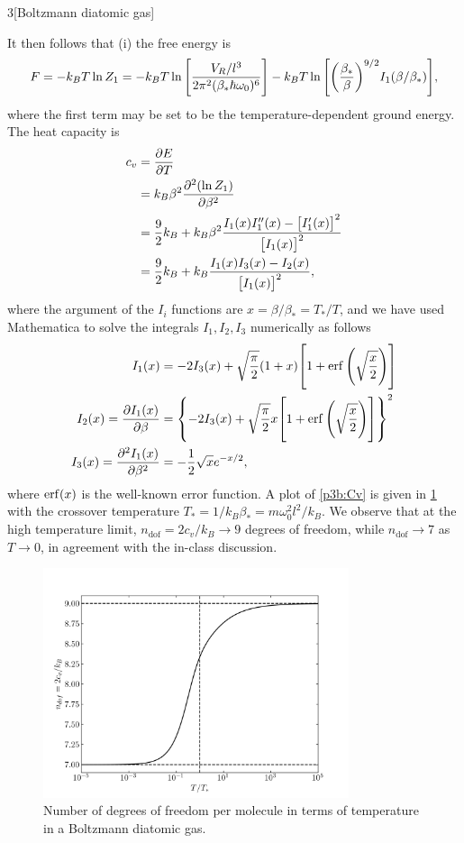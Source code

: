 \documentclass[12pt]{article}
\begin{document}
\begin{problem}{3}[Boltzmann diatomic gas]
\begin{solution}
It then follows that (i) the free energy is
\begin{equation}
    F=-k_BT\ln Z_1 
    =-k_BT\ln\qty[\frac{V_R/l^3}{2\pi^2(\beta_\ast\hbar\omega_0)^6}]
    -k_BT\ln\qty[\qty(\frac{\beta_\ast}{\beta})^{9/2}I_1(\beta/\beta_\ast)],
\end{equation}
where the first term may be set to be the temperature-dependent ground energy.
The heat capacity is
\begin{align}\label{p3b:Cv}
    c_v
    &=\frac{\partial E}{\partial T}\notag\\
    &=k_B\beta^2\frac{\partial^2(\ln Z_1)}{\partial\beta^2}\notag\\
    &=\frac92k_B+k_B\beta^2\frac{I_1(x)I_1''(x)-\qty[I_1'(x)]^2}
        {\qty[I_1(x)]^2}\notag\\
    &=\frac92k_B+k_B\frac{I_1(x)I_3(x)-I_2(x)}{\qty[I_1(x)]^2},
\end{align}
where the argument of the $I_i$ functions are $x=\beta/\beta_\ast=T_\ast/T$, and
we have used Mathematica to solve the integrals $I_1,I_2,I_3$ numerically as
follows
\begin{subequations}
    \begin{align}
        I_1(x)&=-2I_3(x)+\sqrt{\frac\pi2}\qty(1+x)
            \qty[1+\erf\qty(\sqrt{\frac{x}{2}})]\label{p3b:I1}\\
        I_2(x)=\frac{\partial
    I_1(x)}{\partial\beta}&=\qty{-2I_3(x)+\sqrt{\frac\pi2}x\qty[1+\erf\qty(\sqrt{\frac{x}{2}})]}^2\label{p3b:I2}\\
        I_3(x)=\frac{\partial^2 I_1(x)}{\partial\beta^2}
        &=-\frac12\sqrt{x}e^{-x/2}\label{p3b:I3},
    \end{align} 
\end{subequations}
where $\erf(x)$ is the well-known error function. A plot of \eqref{p3b:Cv} is
given in \cref{fig:p3a} with the crossover temperature
$T_\ast=1/k_B\beta_\ast=m\omega_0^2l^2/k_B$. We observe that at the high
temperature limit, $n_\text{dof}=2c_v/k_B\to9$ degrees of freedom, while
$n_\text{dof}\to7$ as $T\to0$, in agreement with the in-class discussion.
\begin{figure}[H]
    \centering
    \includegraphics[width=0.8\textwidth]{p3a.png}
    \caption{Number of degrees of freedom per molecule in terms of
        temperature in a Boltzmann diatomic gas.}
        \label{fig:p3a}
\end{figure}
\end{solution}


\end{problem}
\end{document}

